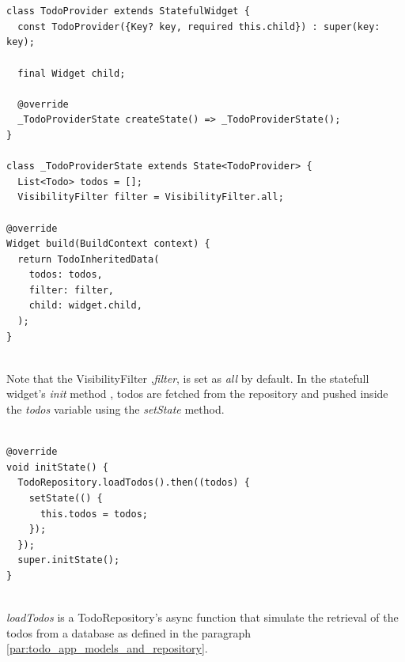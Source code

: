 \mbox{}\\
\begin{code}
 \mbox{}

\label{code:2.18}
\begin{verbatim}

class TodoProvider extends StatefulWidget {
  const TodoProvider({Key? key, required this.child}) : super(key: key);

  final Widget child;

  @override
  _TodoProviderState createState() => _TodoProviderState();
}

class _TodoProviderState extends State<TodoProvider> {
  List<Todo> todos = [];
  VisibilityFilter filter = VisibilityFilter.all;

@override
Widget build(BuildContext context) {
  return TodoInheritedData(
    todos: todos,
    filter: filter,
    child: widget.child,
  );
}
\end{verbatim}
\end{code}
\mbox{}\\
Note that the VisibilityFilter ,\textit{filter}, is set as \textit{all} by default.
In the statefull widget's \textit{init} method , todos are fetched from the repository and pushed inside the \textit{todos} variable using the \textit{setState} method.
\mbox{}\\
\begin{code}
 \mbox{}

\label{code:2.19}
\begin{verbatim}

@override
void initState() {
  TodoRepository.loadTodos().then((todos) {
    setState(() {
      this.todos = todos;
    });
  });
  super.initState();
}
\end{verbatim}
\end{code}
\mbox{}\\
\textit{loadTodos }is a TodoRepository’s async function that simulate the retrieval of the todos from a database as defined in the paragraph \ref{par:todo_app_models_and_repository}.

